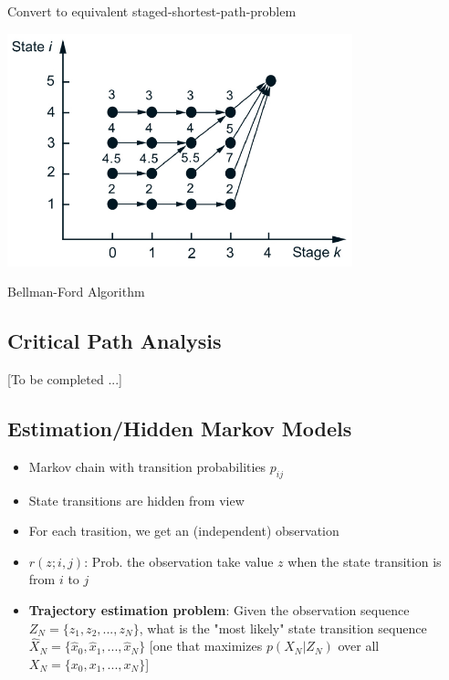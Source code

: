 Convert to equivalent staged-shortest-path-problem

\centerline{\includegraphics[width=10cm]{Lecture2/Fig3.png}}
\centerline{Bellman-Ford Algorithm}

\subsection{Critical Path Analysis}
[To be completed ...]

\subsection{Estimation/Hidden Markov Models}
\begin{itemize}
    \item Markov chain with transition probabilities $p_{ij}$
    \item State transitions are hidden from view
    \item For each trasition, we get an (independent) observation
    \item $r(z;i,j)$: Prob. the observation take value $z$ when the state transition is from $i$ to $j$
    \item \textbf{Trajectory estimation problem}: Given the observation sequence $Z_N=\{z_1,z_2,...,z_N\}$, what is the "most likely" state transition sequence $\hat{X}_N=\{\hat{x}_0,\hat{x}_1,...,\hat{x}_N\}$
    [one that maximizes $p(X_N|Z_N)$ over all $X_N=\{x_0,x_1,...,x_N\}$]
\end{itemize}


